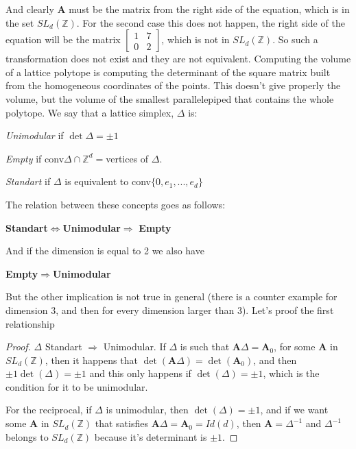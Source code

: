 And clearly $\mathbf{A}$ must be the matrix from the right side of the equation, which is in the set $SL_d(\mathbb{Z})$.
For the second case this does not happen, the right side of the equation will be the matrix $\left[\begin{matrix}1&7\\0&2\end{matrix}\right]$, which is not in $SL_d(\mathbb{Z})$. So such a transformation does not exist and they are not equivalent.
Computing the volume of a lattice polytope is computing the determinant of the square matrix built from the homogeneous coordinates of the points. This doesn't give properly the volume, but the volume of the smallest parallelepiped that contains the whole polytope.
We say that a lattice simplex, $\Delta$ is:

\begin{defn}
\emph{Unimodular} if $\det\Delta=\pm 1$
\end{defn}
\begin{defn}
\emph{Empty} if conv$\Delta\cap\mathbb{Z}^d=$vertices of $\Delta$.
\end{defn}
\begin{defn}
\emph{Standart} if $\Delta$ is equivalent to conv$\{0,e_1,...,e_d\}$
\end{defn}
The relation between these concepts goes as follows:
\begin{center}
\textbf{Standart}$\Leftrightarrow$\textbf{Unimodular}$\Rightarrow$ \textbf{Empty}
\end{center}
And if the dimension is equal to 2 we also have
\begin{center}
\textbf{Empty}$\Rightarrow$\textbf{Unimodular}
\end{center}
But the other implication is not true in general (there is a counter example for dimension 3, and then for every dimension larger than 3).
Let's proof the first relationship
\begin{proof}
$\Delta$ Standart $\Rightarrow$ Unimodular. If $\Delta$ is such that $\mathbf{A}\Delta=\mathbf{A}_0$, for some $\mathbf{A}$ in $SL_d(\mathbb{Z})$, then it happens that $\det(\mathbf{A}\Delta)=\det(\mathbf{A}_0)$, and then $\pm 1\det(\Delta)=\pm1$ and this only happens if $\det(\Delta)=\pm1$, which is the condition for it to be unimodular.

For the reciprocal, if $\Delta$ is unimodular, then $\det(\Delta)=\pm 1$, and if we want some $\mathbf{A}$ in $SL_d(\mathbb{Z})$ that satisfies $\mathbf{A}\Delta=\mathbf{A}_0=Id(d)$, then $\mathbf{A}=\Delta^{-1}$ and $\Delta^{-1}$ belongs to $SL_d(\mathbb{Z})$ because it's determinant is $\pm 1$.
\end{proof}
